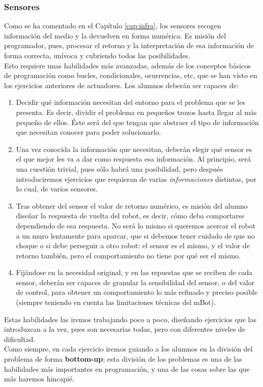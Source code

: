 \subsubsection{Sensores} \label{subsubsec:sensores}
Como se ha comentado en el Capítulo \ref{cap:infra}, los sensores recogen información del medio y la devuelven en forma numérica. Es misión del programador, pues, procesar el retorno y la interpretación de esa información de forma correcta, unívoca y cubriendo todos las posibilidades. \\
Esto requiere unas habilidades más avanzadas, además de los conceptos básicos de programación como bucles, condicionales, ocurrencias, etc, que se han visto en los ejercicios anteriores de actuadores. Los alumnos deberán ser capaces de:
\begin{enumerate}
	\item Decidir qué información necesitan del entorno para el problema que se les presenta. Es decir, dividir el problema en pequeños trozos hasta llegar al más pequeño de ellos. Éste será del que tengan que abstraer el tipo de información que necesitan conocer para poder solucionarlo.
	\item Una vez conocida la información que necesitan, deberán elegir qué sensor es el que mejor les va a dar como respuesta esa información. Al principio, será una cuestión trivial, pues sólo habrá una posibilidad, pero después introduciremos ejercicios que requieran de varias \textit{informaciones} distintas, por lo cual, de varios sensores.
	\item Tras obtener del sensor el valor de retorno numérico, es misión del alumno diseñar la respuesta de vuelta del robot, es decir, cómo deba comportarse dependiendo de esa respuesta. No será lo mismo si queremos acercar el robot a un muro lentamente para aparcar, que si debemos tener cuidado de que no choque o si debe perseguir a otro robot: el sensor es el mismo, y el valor de retorno también, pero el comportamiento no tiene por qué ser el mismo. 	
	\item Fijándose en la necesidad original, y en las repuestas que se reciben de cada sensor, deberán ser capaces de granular la sensibilidad del sensor, o del valor de control, para obtener un comportamiento lo más refinado y preciso posible (siempre teniendo en cuenta las limitaciones técnicas del mBot).
\end{enumerate}

Estas habilidades las iremos trabajando poco a poco, diseñando ejercicios que las introduzcan a la vez, pues son necesarias todas, pero con diferentes niveles de dificultad.\\
Como siempre, en cada ejercicio iremos guiando a los alumnos en la división del problema de forma \textbf{bottom-up}; esta división de los problemas es una de las habilidades más importantes en programación, y una de las cosas sobre las que más haremos hincapié.

